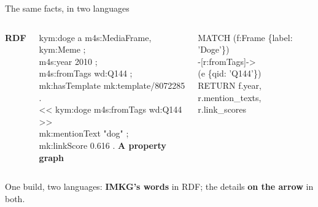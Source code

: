\begin{frame}{The same facts, in two languages}
  \begin{columns}[t]
      {\large\bfseries\color{gmInk}RDF}\par\vskip3mm
      {\normalsize\ttfamily\linespread{1.25}\selectfont
      kym:doge \textcolor{gmInk2}{a} m4s:MediaFrame, kym:Meme ;\\
      \hspace*{4mm}m4s:year 2010 ;\\
      \hspace*{4mm}m4s:fromTags wd:Q144 ;\\
      \hspace*{4mm}mk:hasTemplate mk:template/8072285 .\\[3mm]
      \textcolor{gmInk2}{<<} kym:doge m4s:fromTags wd:Q144 \textcolor{gmInk2}{>>}\\
      \hspace*{4mm}mk:mentionText "dog" ;\\
      \hspace*{4mm}mk:linkScore 0.616 .}
      {\large\bfseries\color{gmInk}A property graph}\par\vskip3mm
      {\normalsize\ttfamily\linespread{1.25}\selectfont
      MATCH (f:Frame \{label: 'Doge'\})\\
      \hspace*{4mm}-[r:fromTags]->\\
      \hspace*{4mm}(e \{qid: 'Q144'\})\\
      RETURN f.year,\\
      \hspace*{4mm}r.mention\_texts,\\
      \hspace*{4mm}r.link\_scores}
  \end{columns}
  \vskip5mm
  {\large\color{gmInk2}One build, two languages: \textbf{\color{gmInk}IMKG's words} in RDF; the details \textbf{\color{gmInk}on the arrow} in both.}
\end{frame}
